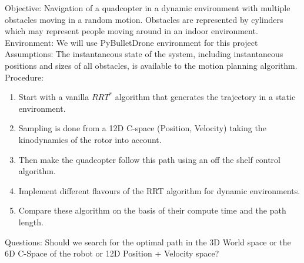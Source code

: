 Objective: Navigation of a quadcopter in a dynamic environment with multiple obstacles moving in a random motion. Obstacles are represented by cylinders which may represent people moving around in an indoor environment.\\
Environment: We will use PyBulletDrone environment for this project\\
Assumptions: The instantaneous state of the system, including instantaneous positions and sizes of all obstacles, is available to the motion planning algorithm.\\
Procedure:
\begin{enumerate}
    \item Start with a vanilla \(RRT^*\) algorithm that generates the trajectory in a static environment.
    \item Sampling is done from a 12D C-space (Position, Velocity) taking the kinodynamics of the rotor into account.
    \item Then make the quadcopter follow this path using an off the shelf control algorithm.
    \item Implement different flavours of the RRT algorithm for dynamic environments. 
    \item Compare these algorithm on the basis of their compute time and the path length.
\end{enumerate}

Questions: Should we search for the optimal path in the 3D World space or the 6D C-Space of the robot or 12D Position + Velocity space?
